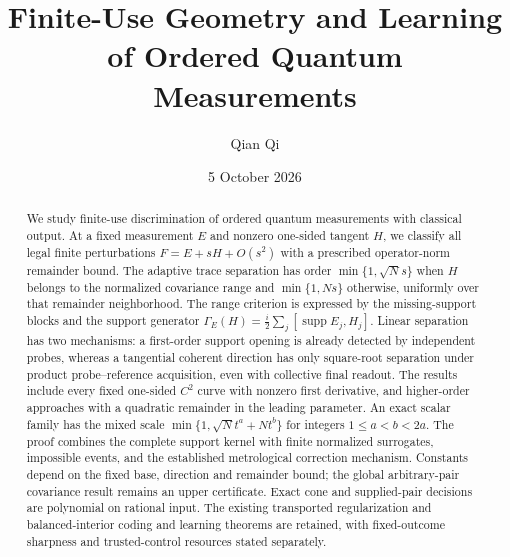 \documentclass[11pt]{amsart}
\title[Finite-use measurement geometry and learning]{Finite-Use Geometry and Learning of Ordered Quantum Measurements}
\author{Qian Qi}
\date{5 October 2026}
\numberwithin{equation}{section}
\theoremstyle{definition}\newtheorem{definition}[theorem]{Definition}
\theoremstyle{remark}\newtheorem{remark}[theorem]{Remark}
\begin{document}
\raggedbottom
\begin{abstract}
We study finite-use discrimination of ordered quantum measurements
with classical output.  At a fixed measurement $E$ and nonzero
one-sided tangent $H$, we classify all legal finite perturbations
$F=E+sH+O(s^2)$ with a prescribed operator-norm remainder bound.
The adaptive trace separation has order $\min\{1,\sqrt N s\}$ when
$H$ belongs to the normalized covariance range and
$\min\{1,Ns\}$ otherwise, uniformly over that remainder neighborhood.
The range criterion is expressed by the missing-support blocks and
the support generator $\Gamma_E(H)=\frac i2\sum_j[\operatorname{supp}E_j,H_j]$.
Linear separation has two mechanisms: a first-order support opening
is already detected by independent probes, whereas a tangential
coherent direction has only square-root separation under product
probe--reference acquisition, even with collective final readout.
The results include every fixed one-sided $C^2$ curve with nonzero
first derivative, and higher-order approaches with a quadratic
remainder in the leading parameter.  An exact scalar family has the
mixed scale $\min\{1,\sqrt N t^a+Nt^b\}$ for integers $1\le a<b<2a$.
The proof combines the complete support kernel with finite normalized
surrogates, impossible events, and the established metrological
correction mechanism.  Constants depend on the fixed base, direction
and remainder bound; the global arbitrary-pair covariance result
remains an upper certificate.  Exact cone and supplied-pair decisions
are polynomial on rational input.  The existing transported
regularization and balanced-interior coding and learning theorems
are retained, with fixed-outcome sharpness and trusted-control
resources stated separately.
\end{abstract}
\maketitle















\end{document}
